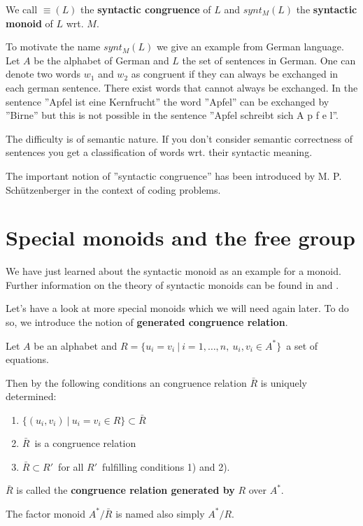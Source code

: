 We call $\equiv (L)$ the {\bf syntactic congruence} of $L$ and $synt_M(L)$ the
{\bf syntactic monoid} of $L$ wrt. $M$.

To motivate the name $synt_M(L)$ we give an example from German language. Let
$A$ be the alphabet of German and $L$ the set of sentences in German. One can
denote two words $w_1$ and $w_2$ as congruent if they can always be exchanged in
each german sentence. There exist words that cannot always be exchanged. In the
sentence ''Apfel ist eine Kernfrucht'' the word ''Apfel'' can be exchanged by
''Birne'' but this is not possible in the sentence ''Apfel schreibt sich A p f e
l''.

The difficulty is of semantic nature. If you don't consider semantic correctness
of sentences you get a classification of words wrt. their syntactic meaning.

The important notion of ''syntactic congruence'' has been introduced by M. P.
Sch\"utzenberger in the context of coding problems.

\section{Special monoids and the free group}

We have just learned about the syntactic monoid as an example for a monoid.
Further information on the theory of syntactic monoids can be found in
\cite{Saaloma} and \cite{Perrot}.

Let's have a look at more special monoids which we will need again later. To do
so, we introduce the notion of {\bf generated congruence relation}.

Let $A$ be an alphabet and $R = \{ u_i = v_i \ |\ i = 1, \ldots, n,\ u_i, v_i \in A^* \}$\ a set of equations.

Then by the following conditions an congruence relation $\bar{R}$ is uniquely
determined:

\begin{enumerate}
  \item $\{ (u_i, v_i)\ |\ u_i = v_i \in R \} \subset \bar{R}$
  \item $\bar{R}$\ is a congruence relation
  \item $\bar{R} \subset R'$\ for all $R'$\ fulfilling conditions 1) and 2).
\end{enumerate}

$\bar{R}$ is called the {\bf congruence relation generated by} $R$ over $A^*$.

The factor monoid $A^*/\bar{R}$ is named also simply $A^*/R$.

